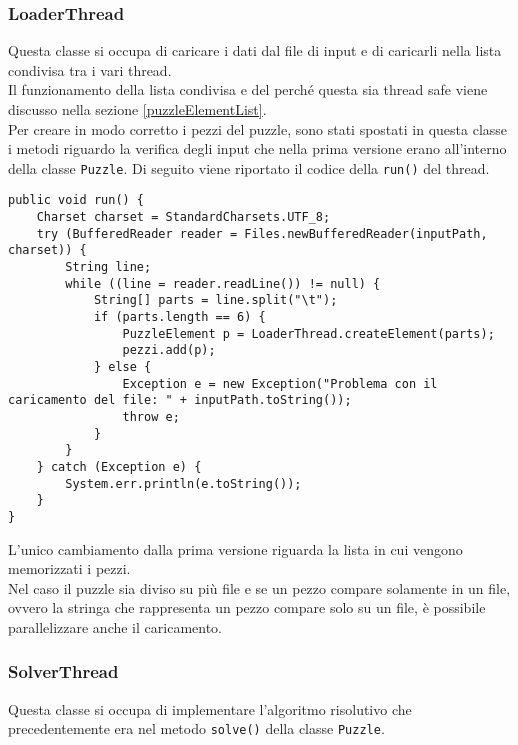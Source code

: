\documentclass[a4paper, 11pt]{article}
\begin{document}
\subsubsection{LoaderThread}
Questa classe si occupa di caricare i dati dal file di input e di caricarli nella lista condivisa tra i vari thread. \\
Il funzionamento della lista condivisa e del perché questa sia thread safe viene discusso nella sezione \ref{puzzleElementList}.\\
Per creare in modo corretto i pezzi del puzzle, sono stati spostati in questa classe i metodi riguardo la verifica degli input che nella prima versione erano all'interno della classe \texttt{Puzzle}.
Di seguito viene riportato il codice della \texttt{run()} del thread.
\begin{lstlisting}
public void run() {
    Charset charset = StandardCharsets.UTF_8;
    try (BufferedReader reader = Files.newBufferedReader(inputPath, charset)) {
        String line;
        while ((line = reader.readLine()) != null) {
            String[] parts = line.split("\t");
            if (parts.length == 6) {
                PuzzleElement p = LoaderThread.createElement(parts);
                pezzi.add(p);
            } else {
                Exception e = new Exception("Problema con il caricamento del file: " + inputPath.toString());
                throw e;
            }
        }
    } catch (Exception e) {
        System.err.println(e.toString());
    }
}
\end{lstlisting}
L'unico cambiamento dalla prima versione riguarda la lista in cui vengono memorizzati i pezzi. \\
Nel caso il puzzle sia diviso su più file e se un pezzo compare solamente in un file, ovvero la stringa che rappresenta un pezzo compare solo su un file, è possibile parallelizzare anche il caricamento.

\subsubsection{SolverThread}
Questa classe si occupa di implementare l'algoritmo risolutivo che precedentemente era nel metodo \texttt{solve()} della classe \texttt{Puzzle}.
\end{document}

